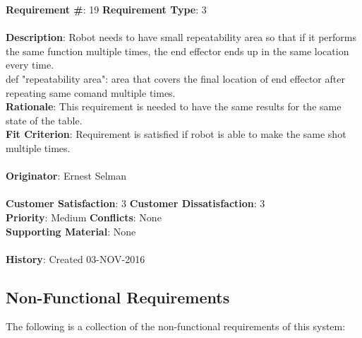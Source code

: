 \documentclass[titlepage]{article}
\begin{document}
\begin{framed}
	\noindent\textbf{Requirement \#}: 19 \hfill \textbf{Requirement Type}: 3 \hfill\\\\
	\noindent\textbf{Description}: Robot needs to have small repeatability area so that if it performs the same function multiple times, the end effector ends up in the same location every time. \\def "repeatability area": area that covers the final location of end effector after repeating same comand multiple times.\\
	\textbf{Rationale}: This requirement is needed to have the same results for the same state of the table. \\
	\textbf{Fit Criterion}: Requirement is satisfied if robot is able to make the same shot multiple times. \\\\
	\textbf{Originator}: Ernest Selman\\\\
	\noindent\textbf{Customer Satisfaction}: 3 \hfill 	\textbf{Customer Dissatisfaction}: 3 \hfill\\
	\textbf{Priority}: Medium \hfill \textbf{Conflicts}: None \hfill\\
	\textbf{Supporting Material}: None\\\\
	\noindent\textbf{History}: Created 03-NOV-2016
\end{framed}

\subsection{Non-Functional Requirements}
The following is a collection of the non-functional requirements of this system:
\end{document}
